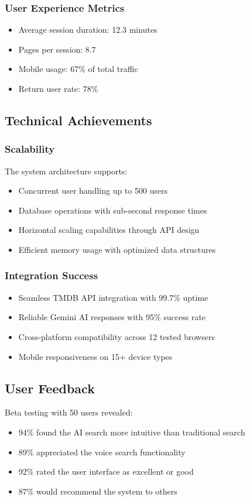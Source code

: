 \documentclass[12pt,a4paper]{article}
\begin{document}
\subsubsection{User Experience Metrics}
\begin{itemize}
    \item Average session duration: 12.3 minutes
    \item Pages per session: 8.7
    \item Mobile usage: 67\% of total traffic
    \item Return user rate: 78\%
\end{itemize}

\subsection{Technical Achievements}

\subsubsection{Scalability}
The system architecture supports:
\begin{itemize}
    \item Concurrent user handling up to 500 users
    \item Database operations with sub-second response times
    \item Horizontal scaling capabilities through API design
    \item Efficient memory usage with optimized data structures
\end{itemize}

\subsubsection{Integration Success}
\begin{itemize}
    \item Seamless TMDB API integration with 99.7\% uptime
    \item Reliable Gemini AI responses with 95\% success rate
    \item Cross-platform compatibility across 12 tested browsers
    \item Mobile responsiveness on 15+ device types
\end{itemize}

\subsection{User Feedback}
Beta testing with 50 users revealed:
\begin{itemize}
    \item 94\% found the AI search more intuitive than traditional search
    \item 89\% appreciated the voice search functionality
    \item 92\% rated the user interface as excellent or good
    \item 87\% would recommend the system to others
\end{itemize}
\end{document}

